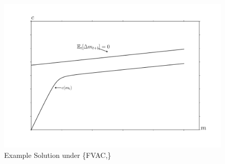 \hypertarget{FVACnotGIC}{}
\begin{figure}[tbp]
\centerline{\includegraphics[width=6in]{Figures/FVACnotGIC}}
\caption{Example Solution under \{{FVAC},\}}
\label{fig:FVACnotGIC}
\end{figure}

